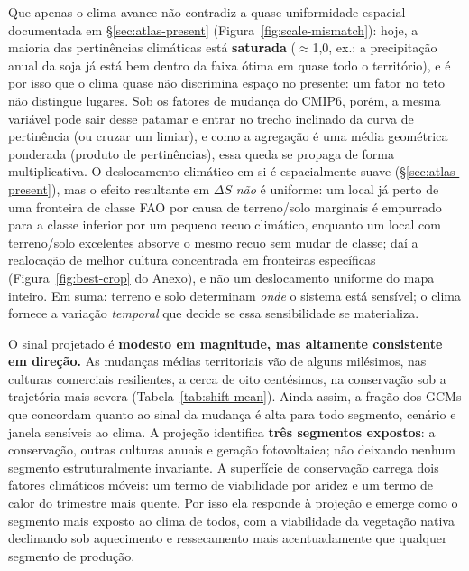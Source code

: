 Que apenas o clima avance não contradiz a quase-uniformidade espacial documentada em
\S\ref{sec:atlas-present} (Figura~\ref{fig:scale-mismatch}): hoje, a maioria das pertinências
climáticas está \textbf{saturada} ($\approx$1,0, ex.: a precipitação anual da soja já está bem
dentro da faixa ótima em quase todo o território), e é por isso que o clima quase não
discrimina espaço no presente: um fator no teto não distingue lugares. Sob os fatores de
mudança do CMIP6, porém, a mesma variável pode sair desse patamar e entrar no trecho inclinado
da curva de pertinência (ou cruzar um limiar), e como a agregação é uma média geométrica
ponderada (produto de pertinências), essa queda se propaga de forma multiplicativa. O
deslocamento climático em si é espacialmente suave (\S\ref{sec:atlas-present}), mas o efeito
resultante em $\Delta S$ \emph{não} é uniforme: um local já perto de uma fronteira de classe
FAO por causa de terreno/solo marginais é empurrado para a classe inferior por um pequeno
recuo climático, enquanto um local com terreno/solo excelentes absorve o mesmo recuo sem mudar
de classe; daí a realocação de melhor cultura concentrada em fronteiras específicas
(Figura~\ref{fig:best-crop} do Anexo), e não um deslocamento uniforme do mapa inteiro. Em suma:
terreno e solo determinam \emph{onde} o sistema está sensível; o clima fornece a variação
\emph{temporal} que decide se essa sensibilidade se materializa.


O sinal projetado é \textbf{modesto em magnitude, mas altamente consistente em direção.} As
mudanças médias territoriais vão de alguns milésimos, nas culturas comerciais resilientes, a
cerca de oito centésimos, na conservação sob a trajetória mais severa (Tabela~\ref{tab:shift-mean}).
Ainda assim, a fração dos GCMs que concordam quanto ao sinal da mudança é alta para todo
segmento, cenário e janela sensíveis ao clima. A projeção identifica
\textbf{três segmentos expostos}: a conservação, outras culturas anuais e geração fotovoltaica; não deixando nenhum
segmento estruturalmente invariante. A superfície de conservação carrega dois fatores climáticos
móveis: um termo de viabilidade por aridez e um termo de calor do trimestre mais quente. Por isso
ela responde à projeção e emerge como o segmento mais exposto ao clima de todos, com a
viabilidade da vegetação nativa declinando sob aquecimento e ressecamento mais acentuadamente que
qualquer segmento de produção.

